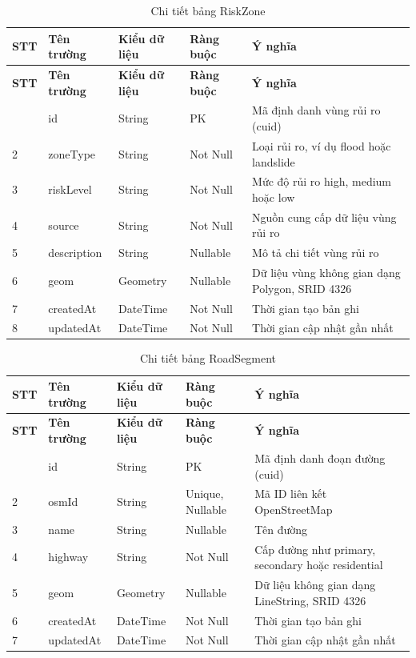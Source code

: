 \begin{longtable}{|p{0.7cm}|p{3.3cm}|p{1.9cm}|p{2.1cm}|p{5.4cm}|}
    \caption{Chi tiết bảng RiskZone}
    \label{tab:db_riskzone} \\
    \hline
    \textbf{STT} & \textbf{Tên trường} & \textbf{Kiểu dữ liệu} & \textbf{Ràng buộc} & \textbf{Ý nghĩa} \\
    \hline
    \endfirsthead
    \hline
    \textbf{STT} & \textbf{Tên trường} & \textbf{Kiểu dữ liệu} & \textbf{Ràng buộc} & \textbf{Ý nghĩa} \\
    \hline
    \endhead
    \hline
    \endfoot
    \hline
    \endlastfoot
    1 & id & String & PK & Mã định danh vùng rủi ro (cuid) \\ \hline
    2 & zoneType & String & Not Null & Loại rủi ro, ví dụ flood hoặc landslide \\ \hline
    3 & riskLevel & String & Not Null & Mức độ rủi ro high, medium hoặc low \\ \hline
    4 & source & String & Not Null & Nguồn cung cấp dữ liệu vùng rủi ro \\ \hline
    5 & description & String & Nullable & Mô tả chi tiết vùng rủi ro \\ \hline
    6 & geom & Geometry & Nullable & Dữ liệu vùng không gian dạng Polygon, SRID 4326 \\ \hline
    7 & createdAt & DateTime & Not Null & Thời gian tạo bản ghi \\ \hline
    8 & updatedAt & DateTime & Not Null & Thời gian cập nhật gần nhất \\
\end{longtable}

\begin{longtable}{|p{0.7cm}|p{3.3cm}|p{1.9cm}|p{2.1cm}|p{5.4cm}|}
    \caption{Chi tiết bảng RoadSegment}
    \label{tab:db_roadsegment} \\
    \hline
    \textbf{STT} & \textbf{Tên trường} & \textbf{Kiểu dữ liệu} & \textbf{Ràng buộc} & \textbf{Ý nghĩa} \\
    \hline
    \endfirsthead
    \hline
    \textbf{STT} & \textbf{Tên trường} & \textbf{Kiểu dữ liệu} & \textbf{Ràng buộc} & \textbf{Ý nghĩa} \\
    \hline
    \endhead
    \hline
    \endfoot
    \hline
    \endlastfoot
    1 & id & String & PK & Mã định danh đoạn đường (cuid) \\ \hline
    2 & osmId & String & Unique, Nullable & Mã ID liên kết OpenStreetMap \\ \hline
    3 & name & String & Nullable & Tên đường \\ \hline
    4 & highway & String & Not Null & Cấp đường như primary, secondary hoặc residential \\ \hline
    5 & geom & Geometry & Nullable & Dữ liệu không gian dạng LineString, SRID 4326 \\ \hline
    6 & createdAt & DateTime & Not Null & Thời gian tạo bản ghi \\ \hline
    7 & updatedAt & DateTime & Not Null & Thời gian cập nhật gần nhất \\
\end{longtable}
